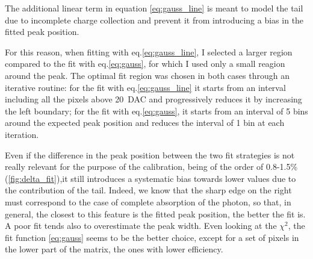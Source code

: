        The additional linear term in equation \ref{eq:gauss_line} is meant to model the tail due to incomplete charge collection and prevent it from introducing a bias in the fitted peak position.

        For this reason, when fitting with eq.\ref{eq:gauss_line}, I selected a larger region compared to the fit with eq.\ref{eq:gauss}, for which I used only a small reagion around the peak. The optimal fit region was chosen in both cases through an iterative routine: for the fit with eq.\ref{eq:gauss_line} it starts from an interval including all the pixels above \SI{20}{DAC} and progressively reduces it by increasing the left boundary; for the fit with eq.\ref{eq:gauss}, it starts from an interval of 5 bins around the expected peak position and reduces the interval of 1 bin at each iteration.
    
        Even if the difference in the peak position between the two fit strategies is not really relevant for the purpose of the calibration, being of the order of 0.8-1.5\% (\ref{fig:delta_fit}),it still introduces a systematic bias towards lower values due to the contribution of the tail. 
        Indeed, we know that the sharp edge on the right must correspond to the case of complete absorption of the photon, so that, in general, the closest to this feature is the fitted peak position, the better the fit is. A poor fit tends also to overestimate the peak width.  
        Even looking at the $\chi^2$, the fit function \ref{eq:gauss} seems to be the better choice, except for a set of pixels in the lower part of the matrix, the ones with lower efficiency.

